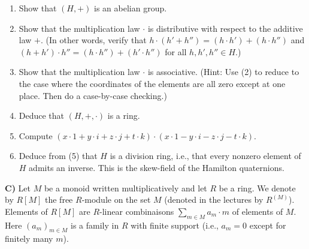 \documentclass[12pt,a4paper]{article}
\begin{document}
\begin{enumerate}
\renewcommand{\labelenumi}{(\arabic{enumi})}
\item Show that $(H,+)$ is an abelian group.
\item Show that the multiplication law $\cdot$ is distributive with respect to
the additive law $+$. (In other words, verify that
$h\cdot(h'+h'')=(h\cdot h')+(h\cdot h'')$ and
$(h+h')\cdot h''=(h\cdot h'')+(h'\cdot h'')$ for all $h,h',h''\in H$.)
\item Show that the multiplication law $\cdot$ is associative.
(Hint: Use (2) to reduce to the case where the coordinates of the elements
are all zero except at one place. Then do a case-by-case checking.)
\item Deduce that $(H,+,\cdot)$ is a ring.
\item Compute $(x\cdot 1+y\cdot i+z\cdot j+t\cdot k)
\cdot(x\cdot 1-y\cdot i-z\cdot j-t\cdot k)$.
\item Deduce from (5) that $H$ is a division ring, i.e., that every nonzero
element of $H$ admits an inverse. This is the skew-field of the Hamilton quaternions.
\end{enumerate}

\newpage

\noindent\textbf{C)} Let $M$ be a monoid written multiplicatively and let $R$
be a ring. We denote by $R[M]$ the free $R$-module on the set $M$
(denoted in the lectures by $R^{(M)}$). Elements of $R[M]$ are $R$-linear
combinaisons $\sum_{m\in M}a_m\cdot m$ of elements of $M$.
Here $(a_m)_{m\in M}$ is a family in $R$ with finite support
(i.e., $a_m=0$ except for finitely many $m$).
\end{document}
